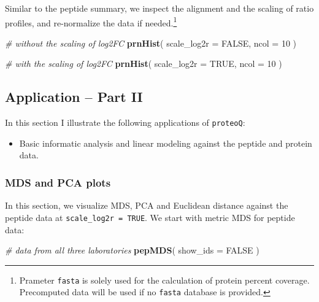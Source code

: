 \documentclass[]{article}
\newenvironment{Shaded}{\begin{snugshade}}{\end{snugshade}}
\newcommand{\CommentTok}[1]{\textcolor[rgb]{0.56,0.35,0.01}{\textit{#1}}}
\newcommand{\DataTypeTok}[1]{\textcolor[rgb]{0.13,0.29,0.53}{#1}}
\newcommand{\DecValTok}[1]{\textcolor[rgb]{0.00,0.00,0.81}{#1}}
\newcommand{\KeywordTok}[1]{\textcolor[rgb]{0.13,0.29,0.53}{\textbf{#1}}}
\newcommand{\NormalTok}[1]{#1}
\newcommand{\OtherTok}[1]{\textcolor[rgb]{0.56,0.35,0.01}{#1}}
\providecommand{\tightlist}{%
  \setlength{\itemsep}{0pt}\setlength{\parskip}{0pt}}
\let\rmarkdownfootnote\footnote%
\def\footnote{\protect\rmarkdownfootnote}
\begin{document}
Similar to the peptide summary, we inspect the alignment and the scaling
of ratio profiles, and re-normalize the data if needed.\footnote{Prameter
  \texttt{fasta} is solely used for the calculation of protein percent
  coverage. Precomputed data will be used if no \texttt{fasta} database
  is provided.}

\begin{Shaded}
\begin{Highlighting}[]
\CommentTok{# without the scaling of log2FC}
\KeywordTok{prnHist}\NormalTok{(}
 \DataTypeTok{scale_log2r =} \OtherTok{FALSE}\NormalTok{, }
 \DataTypeTok{ncol =} \DecValTok{10}
\NormalTok{)}

\CommentTok{# with the scaling of log2FC}
\KeywordTok{prnHist}\NormalTok{(}
 \DataTypeTok{scale_log2r =} \OtherTok{TRUE}\NormalTok{, }
 \DataTypeTok{ncol =} \DecValTok{10}
\NormalTok{)}
\end{Highlighting}
\end{Shaded}

\hypertarget{application-part-ii}{%
\subsection{Application -- Part II}\label{application-part-ii}}

In this section I illustrate the following applications of
\texttt{proteoQ}:

\begin{itemize}
\tightlist
\item
  Basic informatic analysis and linear modeling against the peptide and
  protein data.
\end{itemize}

\hypertarget{mds-and-pca-plots}{%
\subsubsection{MDS and PCA plots}\label{mds-and-pca-plots}}

In this section, we visualize MDS, PCA and Euclidean distance against
the peptide data at \texttt{scale\_log2r\ =\ TRUE}. We start with metric
MDS for peptide data:

\begin{Shaded}
\begin{Highlighting}[]
\CommentTok{# data from all three laboratories}
\KeywordTok{pepMDS}\NormalTok{(}
    \DataTypeTok{show_ids =} \OtherTok{FALSE}
\NormalTok{)}
\end{Highlighting}
\end{Shaded}
\end{document}
